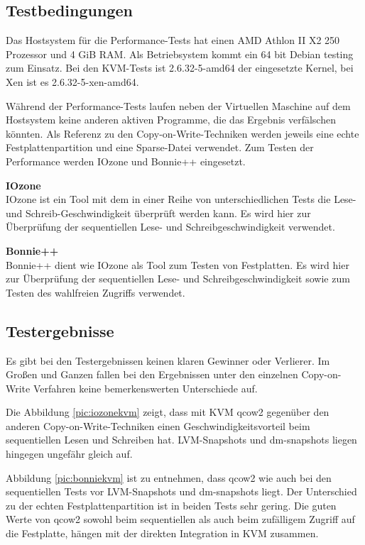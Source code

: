 \subsection{Testbedingungen}
Das Hostsystem für die Performance-Tests hat einen AMD Athlon II X2 250 Prozessor und 4 GiB RAM. Als Betriebsystem kommt ein 64 bit Debian testing zum Einsatz. Bei den KVM-Tests ist 2.6.32-5-amd64 der eingesetzte Kernel, bei Xen ist es 2.6.32-5-xen-amd64.

Während der Performance-Tests laufen neben der Virtuellen Maschine auf dem Hostsystem keine anderen aktiven Programme, die das Ergebnis verfälschen könnten. Als Referenz zu den Copy-on-Write-Techniken werden jeweils eine echte Festplattenpartition und eine Sparse-Datei verwendet. Zum Testen der Performance werden IOzone und Bonnie++ eingesetzt.

\textbf{IOzone} \\
IOzone ist ein Tool mit dem in einer Reihe von unterschiedlichen Tests die Lese- und Schreib-Geschwindigkeit überprüft werden kann. Es wird hier zur Überprüfung der sequentiellen Lese- und Schreibgeschwindigkeit verwendet.

\textbf{Bonnie++} \\
Bonnie++ dient wie IOzone als Tool zum Testen von Festplatten. Es wird hier zur Überprüfung der sequentiellen Lese- und Schreibgeschwindigkeit sowie zum Testen des wahlfreien Zugriffs verwendet.

\subsection{Testergebnisse}
Es gibt bei den Testergebnissen keinen klaren Gewinner oder Verlierer. Im Großen und Ganzen fallen bei den Ergebnissen unter den einzelnen Copy-on-Write Verfahren keine bemerkenswerten Unterschiede auf.

\begin{comment} Bei dem Iozone-Test wurden Dateigrößen von 512 MB, 2 GB, 4 Gb und 8 GB verwendet. Für die Entscheidungsfindung wird jedoch nur der Test mit 8 GB Dateigröße herangezogen. \end{comment}

Die Abbildung \ref{pic:iozonekvm} zeigt, dass mit KVM qcow2 gegenüber den anderen Copy-on-Write-Techniken einen Geschwindigkeitsvorteil beim sequentiellen Lesen und Schreiben hat. LVM-Snapshots und dm-snapshots liegen hingegen ungefähr gleich auf.

Abbildung \ref{pic:bonniekvm} ist zu entnehmen, dass qcow2 wie auch bei den sequentiellen Tests vor LVM-Snapshots und dm-snapshots liegt. Der Unterschied zu der echten Festplattenpartition ist in beiden Tests sehr gering. Die guten Werte von qcow2 sowohl beim sequentiellen als auch beim zufälligem Zugriff auf die Festplatte, hängen mit der direkten Integration in KVM zusammen.

